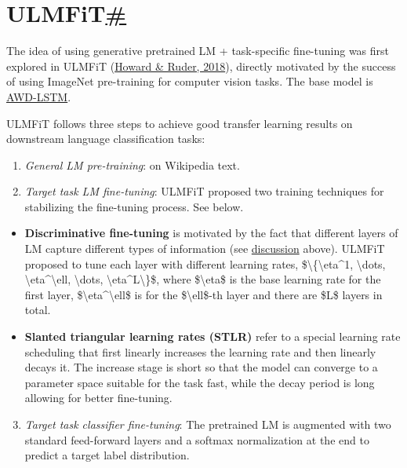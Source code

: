 \section{\texorpdfstring{ULMFiT\hyperref[ulmfit]{\#}}{ULMFiT\#}}\label{ulmfit}

The idea of using generative pretrained LM + task-specific fine-tuning was first explored in ULMFiT (\href{https://arxiv.org/abs/1801.06146}{Howard \& Ruder, 2018}), directly motivated by the success of using ImageNet pre-training for computer vision tasks. The base model is \href{https://arxiv.org/abs/1708.02182}{AWD-LSTM}.

ULMFiT follows three steps to achieve good transfer learning results on downstream language classification tasks:

\begin{enumerate}
\item
  \emph{General LM pre-training}: on Wikipedia text.
\item
  \emph{Target task LM fine-tuning}: ULMFiT proposed two training techniques for stabilizing the fine-tuning process. See below.
\end{enumerate}

\begin{itemize}
\item
  \textbf{Discriminative fine-tuning} is motivated by the fact that different layers of LM capture different types of information (see \hyperref[elmo-representations]{discussion} above). ULMFiT proposed to tune each layer with different learning rates, \$\textbackslash\{\textbackslash eta\^{}1, \textbackslash dots, \textbackslash eta\^{}\textbackslash ell, \textbackslash dots, \textbackslash eta\^{}L\textbackslash\}\$, where \$\textbackslash eta\$ is the base learning rate for the first layer, \$\textbackslash eta\^{}\textbackslash ell\$ is for the \$\textbackslash ell\$-th layer and there are \$L\$ layers in total.
\item
  \textbf{Slanted triangular learning rates (STLR)} refer to a special learning rate scheduling that first linearly increases the learning rate and then linearly decays it. The increase stage is short so that the model can converge to a parameter space suitable for the task fast, while the decay period is long allowing for better fine-tuning.
\end{itemize}

\begin{enumerate}
\setcounter{enumi}{2}
\tightlist
\item
  \emph{Target task classifier fine-tuning}: The pretrained LM is augmented with two standard feed-forward layers and a softmax normalization at the end to predict a target label distribution.
\end{enumerate}

